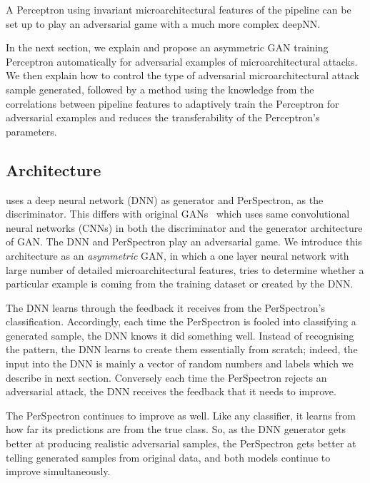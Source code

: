 \begin{note}

A Perceptron using invariant microarchitectural features of the pipeline can be set up to play an adversarial game with a much more complex deepNN. 

% 
\end{note}
 
In the next section, we explain \scheme and propose an asymmetric GAN training Perceptron automatically for adversarial examples of microarchitectural attacks. We then explain how to control the type of adversarial microarchitectural attack sample generated, followed by a method using the knowledge from the correlations between pipeline features to adaptively train the Perceptron for adversarial examples and reduces the transferability of the Perceptron's parameters. 

\subsection{{\scheme} Architecture}

{\scheme} uses a deep neural network (DNN) as generator and PerSpectron,  as the discriminator. This differs with original  GANs~\cite{goodfellow2014generative} which uses same convolutional neural
networks (CNNs) in both the discriminator and the generator
architecture of GAN.  The DNN and PerSpectron play an
adversarial game. We introduce this architecture as an {\em asymmetric} GAN, in which a one layer neural network with large number of detailed microarchitectural features, tries to determine whether a particular example is coming from the training dataset or created by the DNN. 

The DNN learns through the feedback it receives from the PerSpectron's classification. 
 Accordingly, each time the PerSpectron is fooled into classifying a generated sample, the DNN knows it did something well. Instead of recognising the pattern, the DNN learns to create them essentially from scratch; indeed, the input into the DNN is mainly a vector of random numbers and labels which we describe in next section.  Conversely each time the PerSpectron  rejects an adversarial attack, the DNN receives the feedback that it needs to improve.

The PerSpectron continues to improve as well. Like any classifier, it learns from how far its predictions are from the true class. 
So, as the DNN generator gets better at producing realistic adversarial samples, the PerSpectron gets better at telling generated samples from original data, and both models continue to improve simultaneously. 


